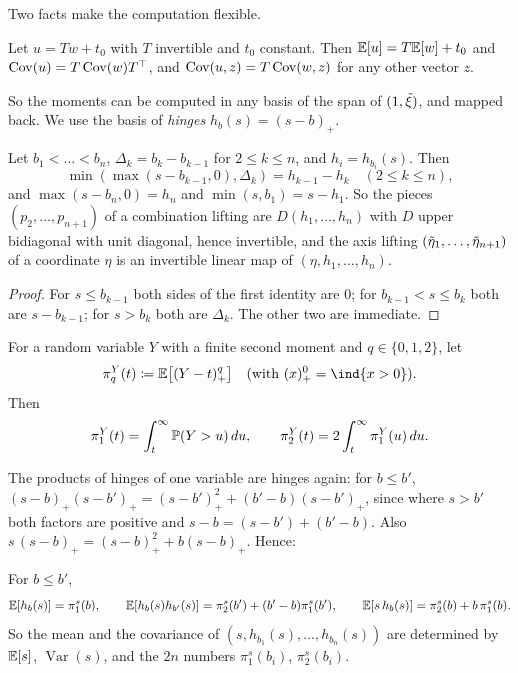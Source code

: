 \documentclass[11pt,a4paper]{article}
\numberwithin{equation}{section}
\newcommand{\pos}[1]{(#1)_+}            %
\newcommand{\hinge}[1]{h_{#1}}          %
\newcommand{\slt}[2]{\pi^{#1}_{#2}}      %
\newcommand{\Var}{\operatorname{Var}}
\begin{document}
Two facts make the computation flexible.

\begin{lemma}
\label{lem:basis}
Let $u = Tw + t_0$ with $T$ invertible and $t_0$ constant.
Then $\mathbb{E}[u] = T\mathbb{E}[w] + t_0$ and $\operatorname{Cov}(u) = T\operatorname{Cov}(w)T^\top$,
and $\operatorname{Cov}(u, z) = T\operatorname{Cov}(w, z)$ for any other vector $z$.
\end{lemma}

So the moments can be computed in any basis of the span of $(1, \tilde\xi)$, and mapped back.
We use the basis of \emph{hinges} $\hinge b(s) = \pos{s - b}$.

\begin{lemma}
\label{lem:hinges}
Let $b_1 < \dots < b_n$, $\Delta_k = b_k - b_{k-1}$ for $2 \le k \le n$, and $\hinge i = \hinge{b_i}(s)$.
Then
\[
\min(\max(s - b_{k-1}, 0), \Delta_k) = \hinge{k-1} - \hinge k \quad (2 \le k \le n),
\]
and $\max(s - b_n, 0) = \hinge n$ and $\min(s, b_1) = s - \hinge 1$.
So the pieces $(p_2, \dots, p_{n+1})$ of a combination lifting are $D(\hinge 1, \dots, \hinge n)$ with $D$ upper bidiagonal with unit diagonal, hence invertible,
and the axis lifting $(\tilde\eta_1, \dots, \tilde\eta_{n+1})$ of a coordinate $\eta$ is an invertible linear map of $(\eta, \hinge 1, \dots, \hinge n)$.
\end{lemma}

\begin{proof}
For $s \le b_{k-1}$ both sides of the first identity are $0$; for $b_{k-1} < s \le b_k$ both are $s - b_{k-1}$; for $s > b_k$ both are $\Delta_k$.
The other two are immediate.
\end{proof}

\begin{definition}
For a random variable $Y$ with a finite second moment and $q \in \{0, 1, 2\}$, let
\[
\slt Y q(t) \defeq \E\bigl[\pos{Y - t}^q\bigr] \quad (\text{with } \pos{x}^0 = \ind{x > 0}).
\]
Then
\[
\slt Y 1(t) = \int_t^\infty \Prob(Y > u)\,du,
\qquad
\slt Y 2(t) = 2\int_t^\infty \slt Y 1(u)\,du .
\]
\end{definition}

The products of hinges of one variable are hinges again:
for $b \le b'$, $\pos{s - b}\pos{s - b'} = \pos{s - b'}^2 + (b' - b)\pos{s - b'}$,
since where $s > b'$ both factors are positive and $s - b = (s - b') + (b' - b)$.
Also $s\,\pos{s - b} = \pos{s - b}^2 + b\pos{s - b}$.
Hence:

\begin{proposition}
\label{prop:one-variable}
For $b \le b'$,
\[
\E[\hinge b(s)] = \slt s1(b), \qquad
\E[\hinge b(s)\hinge{b'}(s)] = \slt s2(b') + (b' - b)\slt s1(b'), \qquad
\E[s\,\hinge b(s)] = \slt s2(b) + b\,\slt s1(b) .
\]
So the mean and the covariance of $(s, \hinge{b_1}(s), \dots, \hinge{b_n}(s))$ are determined by $\mathbb{E}[s]$, $\Var(s)$, and the $2n$ numbers $\slt s1(b_i)$, $\slt s2(b_i)$.
\end{proposition}
\end{document}
